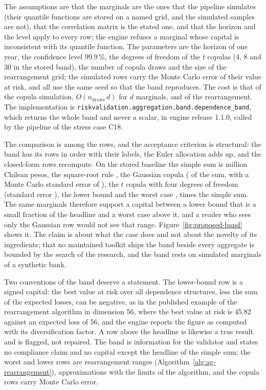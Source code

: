 The assumptions are that the marginals are the ones that the pipeline simulates (their quantile functions are stored on a named grid, and the simulated samples are not), that the
correlation matrix is the stated one, and that the horizon and the level apply to every row; the engine refuses a marginal whose capital is inconsistent with its quantile function. The
parameters are the horizon of one year, the confidence level 99.9\,\%, the degrees of freedom of the $t$ copulas (4, 8 and 30 in the stored band), the number of copula draws and the size of the
rearrangement grid; the simulated rows carry the Monte Carlo error of their value at risk, and all use the same seed so that the band reproduces. The cost is that of the copula simulation,
$O(n_{\mathrm{draws}}\,d)$ for $d$ marginals, and of the rearrangement. The implementation is \texttt{riskvalidation.aggregation.band.dependence\_band}, which returns the whole band
and never a scalar, in engine release 1.1.0, called by the pipeline of the stress case C18.

The comparison is among the \pxNineRows{} rows, and the acceptance criterion is structural: the band has its rows in order with their labels, the Euler allocation adds up, and the closed-form rows
recompute. On the stored baseline the simple sum is \pxNineSum{} million Chilean pesos, the square-root rule \pxNineVc{}, the Gaussian copula \pxNineGauss{} (\pxNineGaussRatio{}
of the sum, with a Monte Carlo standard error of \pxNineGaussSe{}), the $t$ copula with four degrees of freedom \pxNineTfour{} (standard error \pxNineTfourSe{}), the lower bound \pxNineLower{} and the worst case \pxNineWorst{}, \pxNineWorstRatio{} times the simple sum. The same marginals therefore support a capital between
a lower bound that is a small fraction of the headline and a worst case above it, and a reader who sees only the Gaussian row would not see that range. Figure~\ref{fig:proposed-band} shows it. The
claim is about what the case does and not about the novelty of its ingredients; that no maintained toolkit ships the band beside every aggregate is bounded by the search of the research, and the band rests on
simulated marginals of a synthetic bank.

Two conventions of the band deserve a statement. The lower-bound row is a signed capital: the best value at risk over all dependence structures, less the sum of the expected losses, can be negative, as in the published example of the rearrangement
algorithm in dimension 56, where the best value at risk is 45.82 against an expected loss of 56, and the engine reports the figure as computed with its diversification factor. A row above the headline is likewise a true result and is flagged, not repaired. The band is information for
the validator and states no compliance claim and no capital except the headline of the simple sum; the worst and lower rows are rearrangement ranges (Algorithm~\ref{alg:ag-rearrangement}), approximations with the limits of the algorithm, and the copula rows carry Monte Carlo error.

